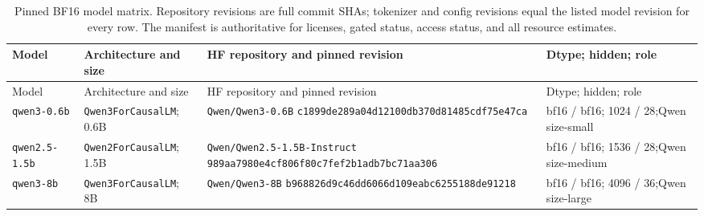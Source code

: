 \documentclass[pdflatex,sn-basic]{sn-jnl}
\begin{document}
\scriptsize
\setlength{\tabcolsep}{2pt}
\begin{longtable}{@{}>{\raggedright\arraybackslash}p{1.45cm}
>{\raggedright\arraybackslash}p{2.25cm}
>{\raggedright\arraybackslash}p{4.35cm}
>{\raggedright\arraybackslash}p{2.35cm}@{}}
\caption{Pinned BF16 model matrix. Repository revisions are full commit SHAs;
tokenizer and config revisions equal the listed model revision for every row.
The manifest is authoritative for licenses, gated status, access status, and
all resource estimates.}\label{tab:model-matrix}\\
\toprule
Model & Architecture and size & HF repository and pinned revision & Dtype; hidden; role \\
\midrule
\endfirsthead
\toprule
Model & Architecture and size & HF repository and pinned revision & Dtype; hidden; role \\
\midrule
\endhead
\bottomrule
\endfoot
\texttt{qwen3-}\newline\texttt{0.6b} & \texttt{Qwen3For}\newline\texttt{CausalLM}; 0.6B & \texttt{Qwen/Qwen3-0.6B}\newline
\texttt{c1899de289}\newline\texttt{a04d12100d}\newline\texttt{b370d81485}\newline\texttt{cdf75e47ca} & bf16 / bf16; 1024 / 28;\newline Qwen size-small \\
\texttt{qwen2.5-}\newline\texttt{1.5b} & \texttt{Qwen2For}\newline\texttt{CausalLM}; 1.5B & \texttt{Qwen/Qwen2.5-1.5B-}\newline\texttt{Instruct}\newline
\texttt{989aa7980e}\newline\texttt{4cf806f80c}\newline\texttt{7fef2b1adb}\newline\texttt{7bc71aa306} & bf16 / bf16; 1536 / 28;\newline Qwen size-medium \\
\texttt{qwen3-8b} & \texttt{Qwen3For}\newline\texttt{CausalLM}; 8B & \texttt{Qwen/Qwen3-8B}\newline
\texttt{b968826d9c}\newline\texttt{46dd6066d1}\newline\texttt{09eabc6255}\newline\texttt{188de91218} & bf16 / bf16; 4096 / 36;\newline Qwen size-large \\

\end{longtable}
\end{document}
